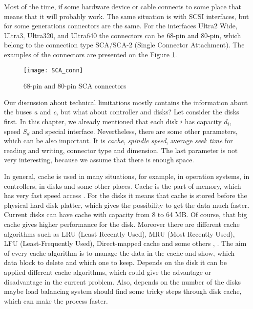 Most of the time, if some hardware device or cable connects to some place that means that it will probably work. The same situation is with SCSI interfaces, but for some generations connectors are the same. For the interfaces Ultra2 Wide, Ultra3, Ultra320, and Ultra640 the connectors can be 68-pin and 80-pin, which belong to the connection type SCA/SCA-2 (Single Connector Attachment). The examples of the connectors are presented on the Figure \ref{fig:SCA_conn}.
\begin{figure}[h]
\begin{center}
	\label{fig:SCA_conn}
  \texttt{[image: SCA\_conn]}
\end{center}
  \caption{68-pin and 80-pin SCA connectors}
  \label{fig:SCA_conn}
\end{figure}


Our discussion about technical limitations mostly contains the information about the buses \emph{a} and \emph{c}, but what about controller and disks? Let consider the disks first. In this chapter, we already mentioned that each disk $i$ has capacity $d_i$, speed $S_d$ and special interface. Nevertheless, there are some other parameters, which can be also important. It is \emph{cache}, \emph{spindle speed}, average \emph{seek time} for reading and writing, connector type and dimension. The last parameter is not very interesting, because we assume that there is enough space.

In general, cache is used in many situations, for example, in operation systems, in controllers, in disks and some other places. Cache is the part of memory, which has very fast speed access \cite{intro_scsi_perform}. For the disks it means that cache is stored before the physical hard disk platter, which gives the possibility to get the data much faster. Current disks can have cache with capacity from 8 to 64 MB. Of course, that big cache gives higher performance for the disk. Moreover there are different cache algorithms such as LRU (Least Recently Used), MRU (Most Recently Used), LFU (Least-Frequently Used), Direct-mapped cache and some others \cite{cache_alg}, \cite{cache_strategies}. The aim of every cache algorithm is to manage the data in the cache and show, which data block to delete and which one to keep. Depends on the disk it can be applied different cache algorithms, which could give the advantage or disadvantage in the current problem. Also, depends on the number of the disks maybe load balancing system should find some tricky steps through disk cache, which can make the process faster.

